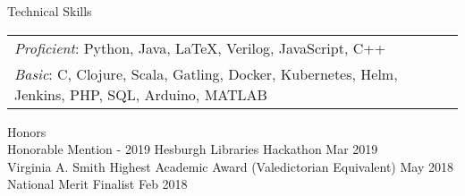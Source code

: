 \documentclass[10pt]{resume} %
\begin{document}

\begin{rSection}{Technical Skills}
\begin{tabular}{ @{} @{\hspace{1ex}} ll }
{\em Proficient}: Python, Java, LaTeX, Verilog, JavaScript, C++ \\ %
{\em Basic}: C, Clojure, Scala, Gatling, Docker, Kubernetes, Helm, Jenkins, PHP, SQL, Arduino, MATLAB  \\

\end{tabular}

\end{rSection}

\begin{rSection}{Honors}
\\ { Honorable Mention - 2019 Hesburgh Libraries Hackathon } \hfill { Mar 2019 }
\\ { Virginia A. Smith Highest Academic Award (Valedictorian Equivalent) } \hfill { May 2018 }
\\ { National Merit Finalist } \hfill { Feb 2018 }
\end{rSection}









\newpage
\end{document}
